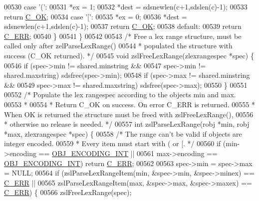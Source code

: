 \begin{DoxyCode}
00530     \textcolor{keywordflow}{case} \textcolor{stringliteral}{'('}:
00531         *ex = 1;
00532         *dest = sdsnewlen(c+1,sdslen(c)-1);
00533         \textcolor{keywordflow}{return} \hyperlink{server_8h_a303769ef1065076e68731584e758d3e1}{C\_OK};
00534     \textcolor{keywordflow}{case} \textcolor{stringliteral}{'['}:
00535         *ex = 0;
00536         *dest = sdsnewlen(c+1,sdslen(c)-1);
00537         \textcolor{keywordflow}{return} \hyperlink{server_8h_a303769ef1065076e68731584e758d3e1}{C\_OK};
00538     \textcolor{keywordflow}{default}:
00539         \textcolor{keywordflow}{return} \hyperlink{server_8h_af98ac28d5f4d23d7ed5985188e6fb7d1}{C\_ERR};
00540     \}
00541 \}
00542 
00543 \textcolor{comment}{/* Free a lex range structure, must be called only after zelParseLexRange()}
00544 \textcolor{comment}{ * populated the structure with success (C\_OK returned). */}
00545 \textcolor{keywordtype}{void} zslFreeLexRange(zlexrangespec *spec) \{
00546     \textcolor{keywordflow}{if} (spec->min != shared.minstring &&
00547         spec->min != shared.maxstring) sdsfree(spec->min);
00548     \textcolor{keywordflow}{if} (spec->max != shared.minstring &&
00549         spec->max != shared.maxstring) sdsfree(spec->max);
00550 \}
00551 
00552 \textcolor{comment}{/* Populate the lex rangespec according to the objects min and max.}
00553 \textcolor{comment}{ *}
00554 \textcolor{comment}{ * Return C\_OK on success. On error C\_ERR is returned.}
00555 \textcolor{comment}{ * When OK is returned the structure must be freed with zslFreeLexRange(),}
00556 \textcolor{comment}{ * otherwise no release is needed. */}
00557 \textcolor{keywordtype}{int} zslParseLexRange(robj *min, robj *max, zlexrangespec *spec) \{
00558     \textcolor{comment}{/* The range can't be valid if objects are integer encoded.}
00559 \textcolor{comment}{     * Every item must start with ( or [. */}
00560     \textcolor{keywordflow}{if} (min->encoding == \hyperlink{server_8h_ae934cf008a0be0ef009c92c2d006a816}{OBJ\_ENCODING\_INT} ||
00561         max->encoding == \hyperlink{server_8h_ae934cf008a0be0ef009c92c2d006a816}{OBJ\_ENCODING\_INT}) \textcolor{keywordflow}{return} \hyperlink{server_8h_af98ac28d5f4d23d7ed5985188e6fb7d1}{C\_ERR};
00562 
00563     spec->min = spec->max = NULL;
00564     \textcolor{keywordflow}{if} (zslParseLexRangeItem(min, &spec->min, &spec->minex) == \hyperlink{server_8h_af98ac28d5f4d23d7ed5985188e6fb7d1}{C\_ERR} ||
00565         zslParseLexRangeItem(max, &spec->max, &spec->maxex) == \hyperlink{server_8h_af98ac28d5f4d23d7ed5985188e6fb7d1}{C\_ERR}) \{
00566         zslFreeLexRange(spec);

\end{DoxyCode}
